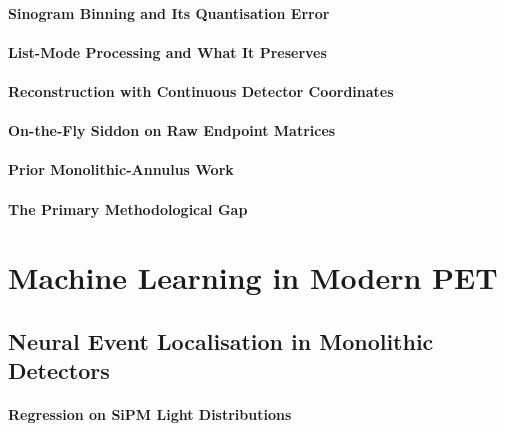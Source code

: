 \paragraph{Sinogram Binning and Its Quantisation Error}

\paragraph{List-Mode Processing and What It Preserves}

\paragraph{Reconstruction with Continuous Detector Coordinates}

\paragraph{On-the-Fly Siddon on Raw Endpoint Matrices}

\paragraph{Prior Monolithic-Annulus Work}

\paragraph{The Primary Methodological Gap}

\section{Machine Learning in Modern PET}
\label{sec:machine-learning}

\subsection{Neural Event Localisation in Monolithic Detectors}
\label{sec:neural-localisation}

\paragraph{Regression on SiPM Light Distributions}

